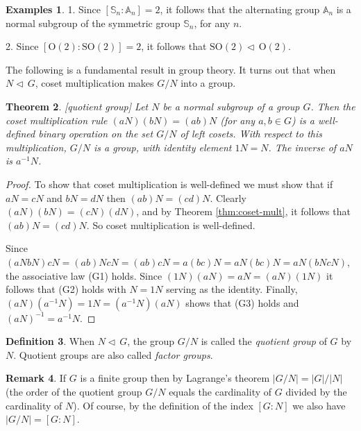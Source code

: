 \documentclass[11pt]{article}
\newtheorem{thm}{Theorem}[section]
\theoremstyle{definition}
\newtheorem{defn}[thm]{Definition}
\newtheorem{examples}[thm]{Examples}
\newtheorem{rmk}[thm]{Remark}
\renewcommand{\O}{\mathrm{O}}
\newcommand{\SO}{\mathrm{SO}}
\newcommand{\Sym}{\mathbb{S}}
\newcommand{\Alt}{\mathbb{A}}
\newcommand{\normal}{\triangleleft\,}%
\begin{document}
\begin{examples}
1. Since $[\Sym_n : \Alt_n] = 2$, it follows that the alternating
group $\Alt_n$ is a normal subgroup of the symmetric group $\Sym_n$,
for any $n$.

2. Since $[\O(2) : \SO(2)] = 2$, it follows that $\SO(2) \normal
\O(2)$.
\end{examples}

The following is a fundamental result in group theory.  It turns out
that when $N \normal G$, coset multiplication makes $G/N$ into a
group.

\begin{thm}[quotient group]
  Let $N$ be a normal subgroup of a group $G$. Then the coset
  multiplication rule $(aN)(bN) = (ab)N$ (for any $a,b \in G$) is a
  well-defined binary operation on the set $G/N$ of left cosets. With
  respect to this multiplication, $G/N$ is a group, with identity
  element $1N = N$. The inverse of $aN$ is $a^{-1}N$.
\end{thm}

\begin{proof}
To show that coset multiplication is well-defined we must show that if
$aN=cN$ and $bN=dN$ then $(ab)N = (cd)N$. Clearly $(aN)(bN) =
(cN)(dN)$, and by Theorem \ref{thm:coset-mult}, it follows that $(ab)N
= (cd)N$. So coset multiplication is well-defined.

Since $(aN bN)cN = (ab)N cN = (ab)c N = a(bc) N = aN (bc)N =
aN(bNcN)$, the associative law (G1) holds. Since $(1N)(aN) = aN =
(aN)(1N)$ it follows that (G2) holds with $N=1N$ serving as the
identity. Finally, $(aN)(a^{-1}N) = 1N = (a^{-1}N)(aN)$ shows that
(G3) holds and $(aN)^{-1} = a^{-1}N$.
\end{proof}

\begin{defn}
  When $N \normal G$, the group $G/N$ is called the {\em quotient
    group} of $G$ by $N$. Quotient groups are also called \emph{factor
    groups}.
\end{defn}


\begin{rmk}
If $G$ is a finite group then by Lagrange's theorem $|G/N| = |G|/|N|$
(the order of the quotient group $G/N$ equals the cardinality of $G$
divided by the cardinality of $N$). Of course, by the definition of
the index $[G\colon N]$ we also have $|G/N| = [G \colon N]$.
\end{rmk}
\end{document}
